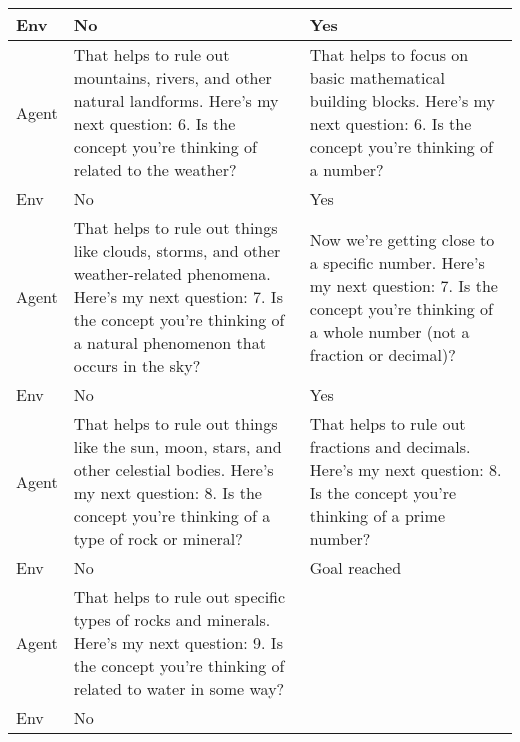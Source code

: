 \begin{table*}[h]
{\begin{tabular}{|p{1cm} | p{7cm} | p{7cm}|}
        \hline
        Env & No & Yes \\
        \hline
        Agent & That helps to rule out mountains, rivers, and other natural landforms. Here's my next question: 6. Is the concept you're thinking of related to the weather? & That helps to focus on basic mathematical building blocks. Here's my next question: 6. Is the concept you're thinking of a number? \\
        \hline
        Env & No & Yes \\
        \hline
        Agent & That helps to rule out things like clouds, storms, and other weather-related phenomena. Here's my next question: 7. Is the concept you're thinking of a natural phenomenon that occurs in the sky? & Now we're getting close to a specific number. Here's my next question: 7. Is the concept you're thinking of a whole number (not a fraction or decimal)? \\
        \hline 
        Env & No & Yes \\
        \hline
        Agent & That helps to rule out things like the sun, moon, stars, and other celestial bodies. Here's my next question: 8. Is the concept you're thinking of a type of rock or mineral? & That helps to rule out fractions and decimals. Here's my next question: 8. Is the concept you're thinking of a prime number? \\
        \hline 
        Env & No & Goal reached \\
        \hline 
        Agent & That helps to rule out specific types of rocks and minerals. Here's my next question: 9. Is the concept you're thinking of related to water in some way? & \\
        \hline
        Env & No & \\
        \bottomrule
        \end{tabular}
    }
    \vspace{-0.3cm}
\end{table*}

\newpage

